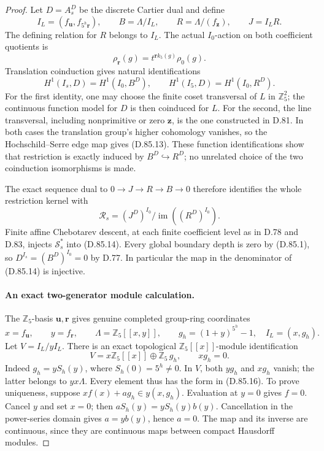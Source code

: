 \begin{proof}
Let \(D=A_s^D\) be the discrete Cartier dual and define
\[
 I_L=(f_{\mathbf u},f_{5^h\mathbf r}),\qquad
 B=\Lambda/I_L,\qquad R=\Lambda/(f_{\mathbf z}),\qquad
 J=I_LR.
                                                               \tag{D.85.11}
\]
The defining relation for \(R\) belongs to \(I_L\).
The actual \(I_0\)-action on both coefficient quotients is
\[
             \rho_{\mathbf r}(g)=t^{\mathbf r k_5(g)}\rho_0(g).
                                                               \tag{D.85.12}
\]
Translation coinduction gives natural identifications
\[
 H^1(I_s,D)=H^1(I_0,B^D),\qquad
 H^1(I_5,D)=H^1(I_0,R^D).
                                                               \tag{D.85.13}
\]
For the first identity, one may choose the finite coset
transversal of \(L\) in \(\mathbb Z_5^2\); the continuous
function model for \(D\) is then coinduced for \(L\).
For the second, the line transversal, including nonprimitive
or zero \(\mathbf z\), is the one constructed in D.81.
In both cases the translation group's higher cohomology
vanishes, so the Hochschild--Serre edge map gives (D.85.13).
These function identifications show that restriction is
exactly induced by \(B^D\hookrightarrow R^D\); no unrelated
choice of the two coinduction isomorphisms is made.

The exact sequence dual to \(0\to J\to R\to B\to0\)
therefore identifies the whole restriction kernel with
\[
 \mathcal R_s=(J^D)^{I_0}/\operatorname{im}((R^D)^{I_0}).
                                                               \tag{D.85.14}
\]
Finite affine Chebotarev descent, at each finite coefficient
level as in D.78 and D.83, injects
\(\mathcal S_s^*\) into (D.85.14).
Every global boundary depth is zero by (D.85.1), so
\(D^{I_s}=(B^D)^{I_0}=0\) by D.77. In particular the
map in the denominator of (D.85.14) is injective.

\paragraph{An exact two-generator module calculation.}
The \(\mathbb Z_5\)-basis \(\mathbf u,\mathbf r\) gives
genuine completed group-ring coordinates
\[
 x=f_{\mathbf u},\qquad y=f_{\mathbf r},\qquad
 \Lambda=\mathbb Z_5[[x,y]],\qquad
 g_h=(1+y)^{5^h}-1,
 \quad I_L=(x,g_h).
                                                               \tag{D.85.15}
\]
Let \(V=I_L/yI_L\). There is an exact topological
\(\mathbb Z_5[[x]]\)-module identification
\[
 V=x\mathbb Z_5[[x]]\oplus\mathbb Z_5\,g_h,
 \qquad xg_h=0.
                                                               \tag{D.85.16}
\]
Indeed \(g_h=yS_h(y)\), where \(S_h(0)=5^h\ne0\).
In \(V\), both \(yg_h\) and \(xg_h\) vanish; the latter
belongs to \(yx\Lambda\). Every element thus has the
form in (D.85.16). To prove uniqueness, suppose
\(xf(x)+a g_h\in y(x,g_h)\). Evaluation at \(y=0\)
gives \(f=0\). Cancel \(y\) and set \(x=0\); then
\(aS_h(y)=yS_h(y)b(y)\). Cancellation in the power-series
domain gives \(a=yb(y)\), hence \(a=0\). The map and its
inverse are continuous, since they are continuous maps
between compact Hausdorff modules.


\end{proof}
